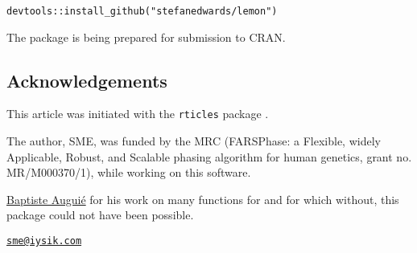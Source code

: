 \begin{verbatim}
devtools::install_github("stefanedwards/lemon")
\end{verbatim}

The package is being prepared for submission to CRAN.

\subsection{Acknowledgements}

This article was initiated with the \texttt{rticles} package
\citep{rticles}.

The author, SME, was funded by the MRC (FARSPhase: a Flexible, widely
Applicable, Robust, and Scalable phasing algorithm for human genetics,
grant no. MR/M000370/1), while working on this software.

\href{https://baptiste.github.io/}{Baptiste Augui\'{e}} for his work on
many functions for  and  for which
without, this package could not have been possible.



\address{%
Stefan McKinnon Edwards\\
The Roslin Insititute, University of Edinburgh\\
Easter Bush\\ Midlothian\\ EH25 9RG\\ Scotland, UK\\ true\\
}
\href{mailto:sme@iysik.com}{\nolinkurl{sme@iysik.com}}

